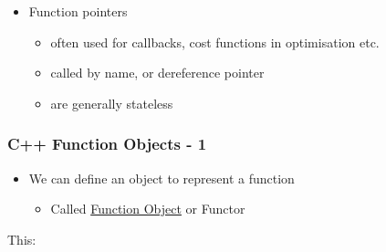 \begin{itemize}
\itemsep1pt\parskip0pt
\item
  Function pointers

  \begin{itemize}
  \itemsep1pt\parskip0pt
  \item
    often used for callbacks, cost functions in optimisation etc.
  \item
    called by name, or dereference pointer
  \item
    are generally stateless
  \end{itemize}
\end{itemize}

\subsubsection{C++ Function Objects - 1}\label{c-function-objects---1}

\begin{itemize}
\itemsep1pt\parskip0pt
\item
  We can define an object to represent a function

  \begin{itemize}
  \itemsep1pt\parskip0pt
  \item
    Called \href{http://en.wikipedia.org/wiki/Function_object}{Function
    Object} or Functor
  \end{itemize}
\end{itemize}

This:

\begin{Shaded}
\begin{Highlighting}[]
 
\NormalTok{\{}
   \NormalTok{()(}    
  \NormalTok{\{}
     
  \NormalTok{\}}
\NormalTok{\};}
\CommentTok{/*}
\CommentTok{*/}
 
\NormalTok{\{}
    \NormalTok{);}
    \NormalTok{);}
    \NormalTok{);}
    \NormalTok{std::cout << items[}\NormalTok{] << } \NormalTok{<< items[}\NormalTok{] << } \NormalTok{<< items[}\NormalTok{] << std::endl;}
     \NormalTok{;}
\NormalTok{\}}
\end{Highlighting}
\end{Shaded}

